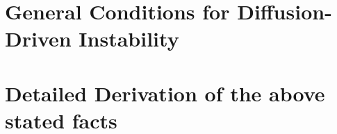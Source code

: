 \section{General Conditions for Diffusion-Driven Instability}

\section*{Detailed Derivation of the above stated facts}
